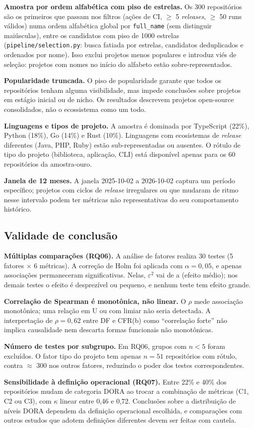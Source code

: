 \textbf{Amostra por ordem alfabética com piso de estrelas.} Os 300 repositórios são os
primeiros que passam nos filtros (ações de CI, $\geq$ 5 \textit{releases}, $\geq$ 50 runs
válidos) numa ordem alfabética global por \texttt{full\_name} (sem distinguir maiúsculas), entre os candidatos
com piso de 1000 estrelas (\texttt{pipeline/selection.py}: busca fatiada por estrelas, candidatos deduplicados
e ordenados por nome). Isso exclui projetos menos populares e introduz viés de seleção: projetos com
nomes no início do alfabeto estão sobre-representados.

\textbf{Popularidade truncada.} O piso de popularidade garante que todos os repositórios
tenham alguma visibilidade, mas impede conclusões sobre projetos em estágio inicial ou de
nicho. Os resultados descrevem projetos open-source consolidados, não o ecossistema como um todo.

\textbf{Linguagens e tipos de projeto.} A amostra é dominada por TypeScript (22\%), Python
(18\%), Go (14\%) e Rust (10\%). Linguagens com ecosistemas de \textit{release} diferentes
(Java, PHP, Ruby) estão sub-representadas ou ausentes. O rótulo de tipo do projeto
(biblioteca, aplicação, CLI) está disponível apenas para os 60 repositórios da amostra-ouro.

\textbf{Janela de 12 meses.} A janela 2025-10-02 a 2026-10-02 captura um período específico;
projetos com ciclos de \textit{release} irregulares ou que mudaram de ritmo nesse intervalo
podem ter métricas não representativas do seu comportamento histórico.

\subsection{Validade de conclusão}

\textbf{Múltiplas comparações (RQ06).} A análise de fatores realiza 30 testes (5 fatores
$\times$ 6 métricas). A correção de Holm foi aplicada com $\alpha = 0{,}05$, e apenas \NSeisSig{}
associações permaneceram significativas. Nelas, $\varepsilon^2$ vai de \NEpsSigMin{} a \NEpsSigMax{} (efeito médio); nos
demais testes o efeito é desprezível ou pequeno, e nenhum teste tem efeito grande.

\textbf{Correlação de Spearman é monotônica, não linear.} O $\rho$ mede associação
monotônica; uma relação em U ou com limiar não seria detectada. A interpretação de
$\rho = 0{,}62$ entre DF e CFR(b) como ``correlação forte'' não implica causalidade nem
descarta formas funcionais não monotônicas.

\textbf{Número de testes por subgrupo.} Em RQ06, grupos com $n < 5$ foram excluídos.
O fator tipo do projeto tem apenas $n = 51$ repositórios com rótulo, contra $\approx$ 300
nos outros fatores, reduzindo o poder dos testes correspondentes.

\textbf{Sensibilidade à definição operacional (RQ07).} Entre 22\% e 40\% dos repositórios
mudam de categoria DORA ao trocar a combinação de métricas (C1, C2 ou C3), com $\kappa$
linear entre 0,46 e 0,72. Conclusões sobre a distribuição de níveis DORA dependem da
definição operacional escolhida, e comparações com outros estudos que adotem definições
diferentes devem ser feitas com cautela.

